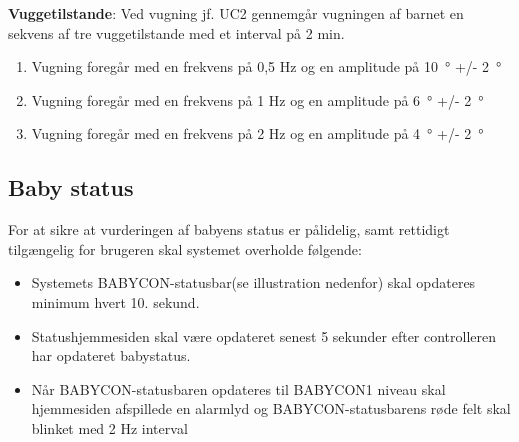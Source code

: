 \textbf{Vuggetilstande}: \label{kravspec:ikke_funk_vuggetilstande}
Ved vugning jf. UC2 gennemgår vugningen af barnet en sekvens af tre vuggetilstande med et interval på 2 min.
\begin{enumerate}

\item Vugning foregår med en frekvens på 0,5 Hz og en amplitude på \SI{10}{\degree} +/- \SI{2}{\degree}
\item Vugning foregår med en frekvens på 1 Hz og en amplitude på \SI{6}{\degree} +/- \SI{2}{\degree}
\item Vugning foregår med en frekvens på 2 Hz og en amplitude på \SI{4}{\degree} +/- \SI{2}{\degree}
\end{enumerate}

\subsection*{Baby status}
For at sikre at vurderingen af babyens status er pålidelig, samt rettidigt tilgængelig for brugeren skal systemet overholde følgende:
\begin{itemize}
\item Systemets BABYCON-statusbar(se illustration nedenfor) skal opdateres minimum hvert 10. sekund.
\item Statushjemmesiden skal være opdateret senest 5 sekunder efter controlleren har opdateret babystatus.
\item Når BABYCON-statusbaren opdateres til BABYCON1 niveau skal hjemmesiden afspillede en alarmlyd og BABYCON-statusbarens røde felt skal blinket med 2 Hz interval
\end{itemize}
